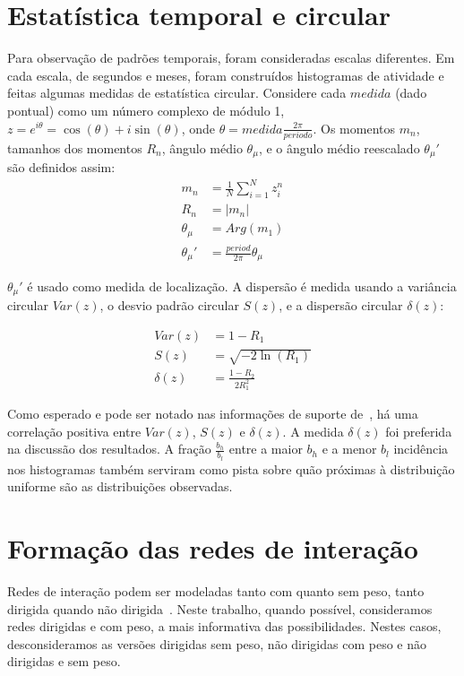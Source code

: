 \documentclass[a4paper,openright,12pt]{report} %
\begin{document}
\section{Estatística temporal e circular}\label{sec:cir}

Para observação de padrões temporais, foram consideradas escalas diferentes.
Em cada escala, de segundos e meses, foram construídos histogramas de atividade
e feitas algumas medidas de estatística circular.
Considere cada $ medida $ (dado pontual) como um número complexo de módulo 1, $z=e^{i\theta}=\cos(\theta)+i\sin(\theta)$, onde $\theta= medida \frac{2\pi}{periodo}$. Os momentos $m_n$, tamanhos dos momentos $R_n$, ângulo médio $\theta_\mu$, e o ângulo médio reescalado $\theta_\mu'$ são definidos assim:
\begin{align}\label{eq:cmom}
    m_n&=\frac{1}{N}\sum_{i=1}^N z_i^n \nonumber\\
    R_n&=|m_n|\\
    \theta_\mu&=Arg(m_1) \nonumber \\
    \theta_\mu'&=\frac{period}{2\pi} \theta_\mu \nonumber
\end{align}

$\theta_\mu'$ é usado como medida de localização. A dispersão é medida usando a variância circular $Var(z)$, 
o desvio padrão circular $S(z)$, e a dispersão circular $\delta(z)$:

\begin{align}\label{eq:cmd}
    Var(z)&=1 - R_1 \nonumber\\
    S(z)&= \sqrt{-2\ln(R_1)}\\
    \delta(z)&=\frac{1-R_2}{2 R_1^2} \nonumber
\end{align}

Como esperado e pode ser notado nas informações de suporte de~\cite{timeS}, há uma correlação positiva entre $Var(z)$, $S(z)$ e $\delta(z)$.
A medida $\delta(z)$ foi preferida na discussão dos resultados.
A fração $\frac{b_h}{b_l}$ entre a maior $b_h $ e a menor $b_l$ incidência nos histogramas
também serviram como pista sobre quão próximas à distribuição uniforme são as distribuições observadas.


\section{Formação das redes de interação}\label{sec:intNet}
Redes de interação podem ser modeladas tanto com quanto sem peso, tanto dirigida quando não dirigida~\cite{bird,newmanCommunityDirected,newmanCommunity2013,newmanBook}.
Neste trabalho, quando possível, consideramos redes dirigidas e com peso, a mais informativa das possibilidades.
Nestes casos, desconsideramos as versões dirigidas sem peso, não dirigidas com peso e não dirigidas e sem peso.
\end{document}
